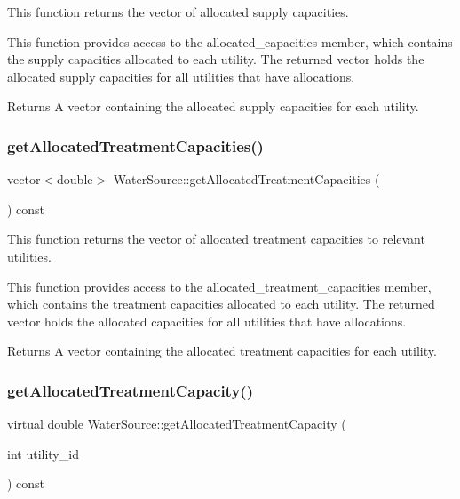 This function returns the vector of allocated supply capacities. 

This function provides access to the {\ttfamily allocated\+\_\+capacities} member, which contains the supply capacities allocated to each utility. The returned vector holds the allocated supply capacities for all utilities that have allocations.

\begin{DoxyReturn}{Returns}
A vector containing the allocated supply capacities for each utility. 
\end{DoxyReturn}
\mbox{\label{classWaterSource_a48df9ae09a8a7844beb18c35382adba1}} 
\subsubsection{\texorpdfstring{get\+Allocated\+Treatment\+Capacities()}{getAllocatedTreatmentCapacities()}}
{\footnotesize\ttfamily vector$<$double$>$ Water\+Source\+::get\+Allocated\+Treatment\+Capacities (\begin{DoxyParamCaption}{ }\end{DoxyParamCaption}) const}



This function returns the vector of allocated treatment capacities to relevant utilities. 

This function provides access to the {\ttfamily allocated\+\_\+treatment\+\_\+capacities} member, which contains the treatment capacities allocated to each utility. The returned vector holds the allocated capacities for all utilities that have allocations.

\begin{DoxyReturn}{Returns}
A vector containing the allocated treatment capacities for each utility. 
\end{DoxyReturn}
\mbox{\label{classWaterSource_ab98528c4d2e6ecd14cb2c813b1d445c6}} 
\subsubsection{\texorpdfstring{get\+Allocated\+Treatment\+Capacity()}{getAllocatedTreatmentCapacity()}}
{\footnotesize\ttfamily virtual double Water\+Source\+::get\+Allocated\+Treatment\+Capacity (\begin{DoxyParamCaption}\item[{int}]{utility\+\_\+id }\end{DoxyParamCaption}) const\hspace{0.3cm}{\ttfamily [virtual]}}



